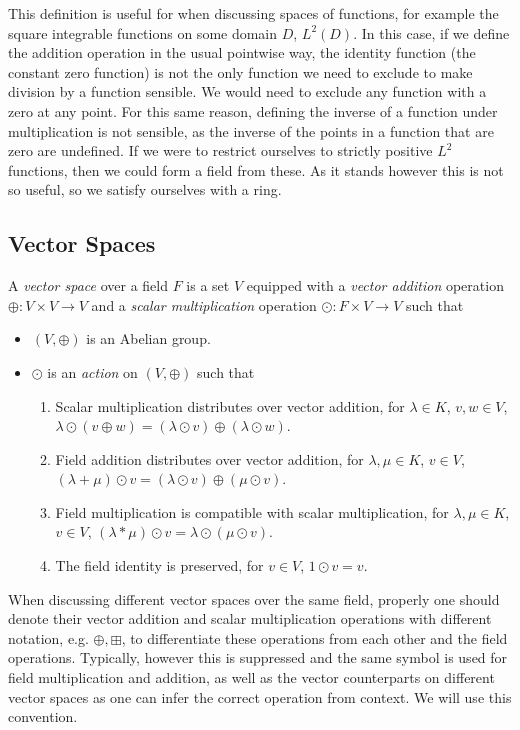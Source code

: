 This definition is useful for when discussing spaces of functions, for example the square integrable functions on some domain \(D\), \(L^2(D)\).
In this case, if we define the addition operation in the usual pointwise way, the identity function (the constant zero function) is not the only function we need to exclude to make division by a function sensible.
We would need to exclude any function with a zero at any point.
For this same reason, defining the inverse of a function under multiplication is not sensible, as the inverse of the points in a function that are zero are undefined.
If we were to restrict ourselves to strictly positive \(L^2\) functions, then we could form a field from these.
As it stands however this is not so useful, so we satisfy ourselves with a ring.


\subsection{Vector Spaces}
\begin{definition}
	A \emph{vector space} over a field \(F\) is a set \(V\) equipped with a \emph{vector addition} operation \(\oplus: V\times V \to V\) and a \emph{scalar multiplication} operation \(\odot: F \times V \to V\) such that 
	\begin{itemize}
		\item \((V, \oplus)\) is an Abelian group.
		\item \(\odot\) is an \emph{action} on \((V, \oplus)\) such that
		\begin{enumerate}
			\item Scalar multiplication distributes over vector addition, for \(\lambda \in K\), \(v, w \in V\), \(\lambda \odot (v \oplus w) =  (\lambda \odot v) \oplus (\lambda \odot w)\).
			\item Field addition distributes over vector addition, for \(\lambda, \mu \in K\), \(v \in V\), \((\lambda + \mu)\odot v =  (\lambda \odot v) \oplus (\mu \odot v)\).
			\item Field multiplication is compatible with scalar multiplication, for \(\lambda, \mu \in K\), \(v \in V\), \((\lambda * \mu)\odot v =  \lambda \odot (\mu \odot v)\).
			\item The field identity is preserved, for \(v\in V\), \(1 \odot v = v\).
		\end{enumerate} 
	\end{itemize}
\end{definition}
When discussing different vector spaces over the same field, properly one should denote their vector addition and scalar multiplication operations with different notation, e.g. \(\oplus, \boxplus\), to differentiate these operations from each other and the field operations.
Typically, however this is suppressed and the same symbol is used for field multiplication and addition, as well as the vector counterparts on different vector spaces as one can infer the correct operation from context.
We will use this convention.

